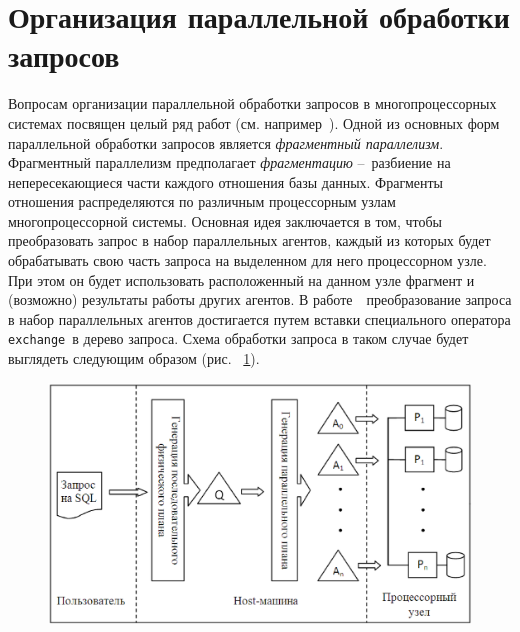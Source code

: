 \documentclass[11pt,oneside]{article}
\begin{document}
	\section{Организация параллельной обработки запросов}\label{S_ParQueryProcessing}
	\par Вопросам организации параллельной обработки запросов в многопроцессорных системах посвящен целый ряд работ (см. например~\cite{B_Sokolinsky2001, B_Aloisio2005, B_Dutra2004}). Одной из основных форм параллельной обработки запросов является \textit{фрагментный параллелизм}. Фрагментный параллелизм предполагает \textit{фрагментацию} \---~разбиение на непересекающиеся части каждого отношения базы данных. Фрагменты отношения распределяются по различным процессорным узлам многопроцессорной системы. Основная идея заключается в том, чтобы преобразовать запрос в набор параллельных агентов, каждый из которых будет обрабатывать свою часть запроса на выделенном для него процессорном узле. При этом он будет использовать расположенный на данном узле фрагмент и (возможно) результаты работы других агентов. В работе~\cite{B_Sokolinsky2001}~преобразование запроса в набор параллельных агентов достигается путем вставки специального оператора \texttt{exchange}~в дерево запроса. Схема обработки запроса в таком случае будет выглядеть следующим образом (рис. ~\ref{fig:qexec}).
	
	\begin{figure}[h]
		\centering
		\includegraphics[width=0.7\linewidth]{qexec}
		\caption{}
		\label{fig:qexec}
	\end{figure}	
	
\end{document}
